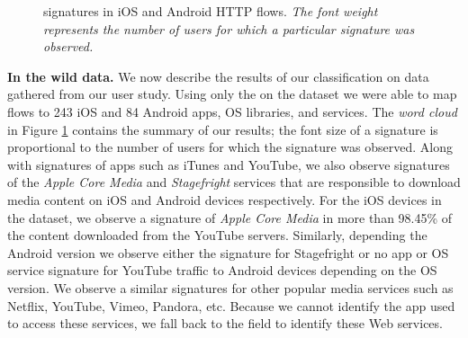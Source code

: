 \begin{figure}
\newline
{}
\caption{\useragent signatures in  iOS and Android HTTP flows. \emph{The font weight represents the number of users for which a particular signature was observed.}}
\vspace{\postfigspace}
\label{fig:http-wordcloud}
\end{figure}

\textbf{In the wild data.}
We now describe the results of our classification on data gathered from our user study.
Using only the \useragent on the \mobWild dataset we were able to map flows to 243 iOS and 84 Android apps, OS libraries, and services. 
The \emph{word cloud} in Figure \ref{fig:http-wordcloud} contains the summary of our results; the font size of a signature is proportional to the number of users for which the signature was observed.
Along with signatures of apps such as iTunes and YouTube, we also observe signatures of the \emph{Apple Core Media} and \emph{Stagefright} services that are responsible to download media content on iOS and Android devices respectively.
For the iOS devices in the \mobWild dataset, we observe a signature of \emph{Apple Core Media} in more than 98.45\% of the content downloaded from the YouTube servers.
Similarly, depending the Android version we observe either the signature for Stagefright or no app or OS service signature for YouTube traffic to Android devices depending on the OS version. 
We observe a similar signatures for other popular media services such as Netflix, YouTube, Vimeo, Pandora, etc.
Because we cannot identify the app used to access these services, we fall back to the \httphost field to identify these Web services.

